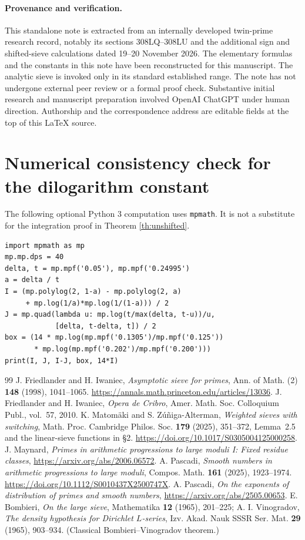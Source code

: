 \documentclass[11pt]{article}
\begin{document}
\paragraph{Provenance and verification.}
This standalone note is extracted from an internally developed
twin-prime research record, notably its sections 308LQ--308LU and
the additional sign and shifted-sieve calculations dated
19--20 November 2026.  The elementary formulas and the constants
in this note have been reconstructed for this manuscript.
The analytic sieve is invoked only in its standard established range.
The note has not undergone external peer review or a formal proof check.
Substantive initial research and manuscript preparation involved
OpenAI ChatGPT under human direction.  Authorship and the correspondence
address are editable fields at the top of this \LaTeX{} source.

\appendix
\section{Numerical consistency check for the dilogarithm constant}
The following optional Python 3 computation uses \texttt{mpmath}.
It is not a substitute for the integration proof in
Theorem \ref{th:unshifted}.
\begin{verbatim}
import mpmath as mp
mp.mp.dps = 40
delta, t = mp.mpf('0.05'), mp.mpf('0.24995')
a = delta / t
I = (mp.polylog(2, 1-a) - mp.polylog(2, a)
     + mp.log(1/a)*mp.log(1/(1-a))) / 2
J = mp.quad(lambda u: mp.log(t/max(delta, t-u))/u,
            [delta, t-delta, t]) / 2
box = (14 * mp.log(mp.mpf('0.1305')/mp.mpf('0.125'))
       * mp.log(mp.mpf('0.202')/mp.mpf('0.200')))
print(I, J, I-J, box, 14*I)
\end{verbatim}

\begin{thebibliography}{99}
 J. Friedlander and H. Iwaniec,
 \emph{Asymptotic sieve for primes},
 Ann. of Math. (2) \textbf{148} (1998), 1041--1065.
 \url{https://annals.math.princeton.edu/articles/13036}.
 J. Friedlander and H. Iwaniec,
 \emph{Opera de Cribro}, Amer. Math. Soc. Colloquium Publ.,
 vol.~57, 2010.
 K. Matom\"aki and S. Z\'u\~niga-Alterman,
 \emph{Weighted sieves with switching},
 Math. Proc. Cambridge Philos. Soc. \textbf{179} (2025), 351--372,
 Lemma~2.5 and the linear-sieve functions in \S2.
 \url{https://doi.org/10.1017/S0305004125000258}.
 J. Maynard,
 \emph{Primes in arithmetic progressions to large moduli I:
 Fixed residue classes},
 \url{https://arxiv.org/abs/2006.06572}.
 A. Pascadi,
 \emph{Smooth numbers in arithmetic progressions to large moduli},
 Compos. Math. \textbf{161} (2025), 1923--1974.
 \url{https://doi.org/10.1112/S0010437X2500747X}.
 A. Pascadi,
 \emph{On the exponents of distribution of primes and smooth numbers},
 \url{https://arxiv.org/abs/2505.00653}.
 E. Bombieri,
 \emph{On the large sieve}, Mathematika \textbf{12} (1965), 201--225;
 A. I. Vinogradov, \emph{The density hypothesis for Dirichlet
 $L$-series}, Izv. Akad. Nauk SSSR Ser. Mat. \textbf{29} (1965),
 903--934.  (Classical Bombieri--Vinogradov theorem.)
\end{thebibliography}
\end{document}

